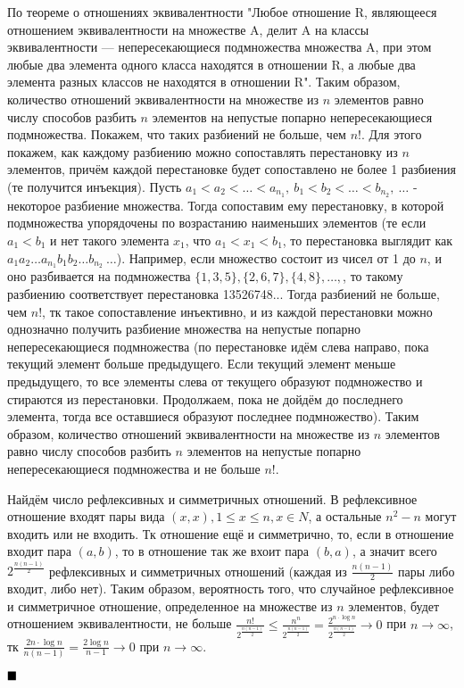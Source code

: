 \documentclass[a4paper, 16pt]{article}
\renewcommand{\inf}{\infty}
\newenvironment{proof}[1][Доказательство]{%
	\begin{trivlist}
		\item[\hskip \labelsep {\bfseries #1:}]
		\item \hspace{14pt}
	}{
		$ \hfill\blacksquare $
	\end{trivlist}
	\hfill\break
}
\begin{document}
\begin{proof}
			 По теореме о отношениях эквивалентности "Любое отношение R, являющееся отношением эквивалентности на
			 множестве A, делит A на классы эквивалентности — непересекающиеся подмножества множества A, при этом любые два элемента одного класса находятся в
			 отношении R, а любые два элемента разных классов не находятся в отношении R". Таким образом, количество отношений эквивалентности на множестве из $n$ элементов равно числу способов разбить $n$ элементов на непустые попарно непересекающиеся подмножества. Покажем, что таких разбиений не больше, чем $n!$. Для этого покажем, как каждому разбиению можно сопоставлять перестановку из $n$  элементов, причём каждой перестановке будет сопоставлено не более 1 разбиения (те получится инъекция).  Пусть $a_1 < a_2 < \dots < a_{n_1},\ b_1 < b_2 < \dots < b_{n_2}, \ \dots$ - некоторое разбиение множества. Тогда сопоставим ему перестановку, в которой подмножества упорядочены по возрастанию наименьших элементов (те если $a_1 < b_1$ и нет такого элемента $x_1$, что $a_1 < x_1 < b_1$, то перестановка выглядит как $a_1 a_2  \dots  a_{n_1} b_1  b_2  \dots b_{n_2} \ \dots$). Например, если множество состоит из чисел от 1 до $n$, и оно разбивается на подмножества $\{1, 3, 5\}, \{2, 6, 7\}, \{4, 8\}, \dots,$, то такому разбиению соответствует перестановка 13526748... Тогда разбиений не больше, чем $n!$, тк такое сопоставление инъективно, и из каждой перестановки можно однозначно получить разбиение множества на непустые попарно непересекающиеся подмножества (по перестановке идём слева направо, пока текущий элемент больше предыдущего. Если текущий элемент меньше предыдущего, то все элементы слева от текущего образуют подмножество и стираются из перестановки. Продолжаем, пока не дойдём до последнего элемента, тогда все оставшиеся образуют последнее подмножество). Таким образом, количество отношений эквивалентности на множестве из $n$ элементов равно числу способов разбить $n$ элементов на непустые попарно непересекающиеся подмножества и не больше $n!$. 
			 
			Найдём число рефлексивных и симметричных отношений. В рефлексивное отношение входят пары вида $(x, x), 1 \leq x \leq n, x \in N$, а остальные $n^2 - n$ могут входить или не входить. Тк отношение ещё и симметрично, то, если в отношение входит пара $(a, b)$, то в отношение так же вхоит пара $(b, a)$, а значит всего $2^{\frac{n(n-1)}{2}}$ рефлексивных и симметричных отношений (каждая из $\frac{n(n-1)}{2}$ пары либо входит, либо нет). Таким образом, вероятность того, что случайное рефлексивное и симметричное отношение, определенное на множестве из $n$ элементов, будет отношением эквивалентности, не больше $\frac{n!}{2^{\frac{n(n-1)}{2}}} \leq \frac{n^n}{2^{\frac{n(n-1)}{2}}} =
			\frac{2^{n \cdot \log n}}{2^{\frac{n(n-1)}{2}}} \to 0$ при $n \to \inf$, тк $\frac{2n \cdot \log n}{n(n-1)} = \frac{2 \log n}{n - 1}\to 0$ при $n \to \inf$.
			 
		\end{proof}
	
	
	
	
	
	
	
	
\end{document}
